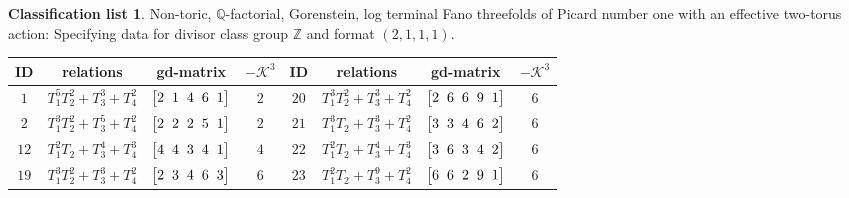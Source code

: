 \documentclass[10pt,a4paper]{amsart}
\theoremstyle{definition}
\newtheorem{class-list}[thm]{Classification list}
\def\ZZ{{\mathbb Z}}
\def\QQ{{\mathbb Q}}
\numberwithin{equation}{section}
\begin{document}
\begin{class-list}
Non-toric, $\QQ$-factorial, Gorenstein, log terminal Fano
threefolds of Picard number one with an effective two-torus action:
Specifying data for divisor class group $\ZZ$ and format $(2,1,1,1)$.
\begin{table}[h!]\centering\setlength{\tabcolsep}{3.5pt}
\renewcommand{\arraystretch}{1.3}\small\tabulinesep=1mm
\begin{tabu}{c|c|c|c||c|c|c|c}
\hline
ID&relations&gd-matrix&$-\mathcal{K}^3$&ID&relations&gd-matrix&$-\mathcal{K}^3$
\\
\hline
${1}$&${T_{1}^{5}T_{2}^{2}+T_{3}^{3}+T_{4}^{2}}$
&$\arraycolsep=1mm\begin{bmatrix}{2} & {1} & {4} & {6} & {1}\end{bmatrix}$&${2}$
&${20}$&${T_{1}^{3}T_{2}^{2}+T_{3}^{3}+T_{4}^{2}}$
&$\arraycolsep=1mm\begin{bmatrix}{2} & {6} & {6} & {9} & {1}\end{bmatrix}$&${6}$
\\
\hline
${2}$&${T_{1}^{3}T_{2}^{2}+T_{3}^{5}+T_{4}^{2}}$
&$\arraycolsep=1mm\begin{bmatrix}{2} & {2} & {2} & {5} & {1}\end{bmatrix}$&${2}$
&${21}$&${T_{1}^{3}T_{2}+T_{3}^{3}+T_{4}^{2}}$
&$\arraycolsep=1mm\begin{bmatrix}{3} & {3} & {4} & {6} & {2}\end{bmatrix}$&${6}$
\\
\hline
${12}$&${T_{1}^{2}T_{2}+T_{3}^{4}+T_{4}^{3}}$
&$\arraycolsep=1mm\begin{bmatrix}{4} & {4} & {3} & {4} & {1}\end{bmatrix}$&${4}$
&${22}$&${T_{1}^{2}T_{2}+T_{3}^{4}+T_{4}^{3}}$
&$\arraycolsep=1mm\begin{bmatrix}{3} & {6} & {3} & {4} & {2}\end{bmatrix}$&${6}$
\\
\hline
${19}$&${T_{1}^{3}T_{2}^{2}+T_{3}^{3}+T_{4}^{2}}$
&$\arraycolsep=1mm\begin{bmatrix}{2} & {3} & {4} & {6} & {3}\end{bmatrix}$&${6}$
&${23}$&${T_{1}^{2}T_{2}+T_{3}^{9}+T_{4}^{2}}$
&$\arraycolsep=1mm\begin{bmatrix}{6} & {6} & {2} & {9} & {1}\end{bmatrix}$&${6}$
\\
\hline
\end{tabu}\vspace{-2mm}
\end{table}



\end{class-list}
\end{document}
